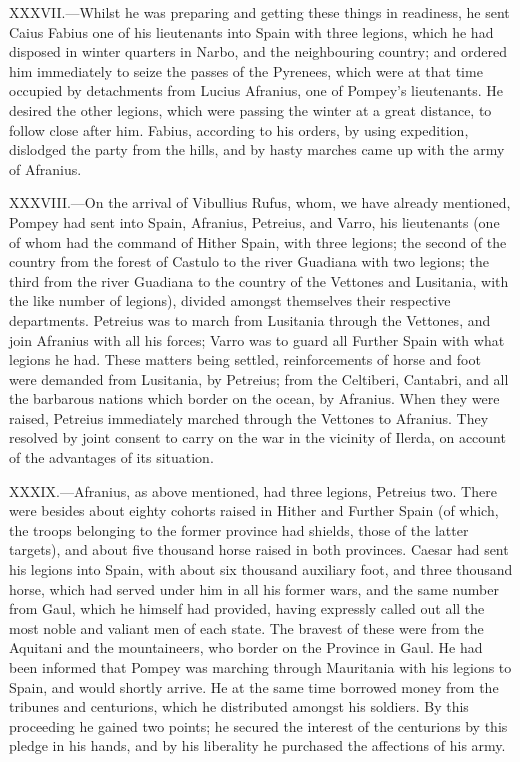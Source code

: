 XXXVII.—Whilst he was preparing and getting these things in readiness,
he sent Caius Fabius one of his lieutenants into Spain with three
legions, which he had disposed in winter quarters in Narbo, and the
neighbouring country; and ordered him immediately to seize the passes of
the Pyrenees, which were at that time occupied by detachments from
Lucius Afranius, one of Pompey's lieutenants. He desired the other
legions, which were passing the winter at a great distance, to follow
close after him. Fabius, according to his orders, by using expedition,
dislodged the party from the hills, and by hasty marches came up with
the army of Afranius.

XXXVIII.—On the arrival of Vibullius Rufus, whom, we have already
mentioned, Pompey had sent into Spain, Afranius, Petreius, and Varro,
his lieutenants (one of whom had the command of Hither Spain, with three
legions; the second of the country from the forest of Castulo to the
river Guadiana with two legions; the third from the river Guadiana to
the country of the Vettones and Lusitania, with the like number of
legions), divided amongst themselves their respective departments.
Petreius was to march from Lusitania through the Vettones, and join
Afranius with all his forces; Varro was to guard all Further Spain with
what legions he had. These matters being settled, reinforcements of
horse and foot were demanded from Lusitania, by Petreius; from the
Celtiberi, Cantabri, and all the barbarous nations which border on the
ocean, by Afranius. When they were raised, Petreius immediately marched
through the Vettones to Afranius. They resolved by joint consent to
carry on the war in the vicinity of Ilerda, on account of the advantages
of its situation.

XXXIX.—Afranius, as above mentioned, had three legions, Petreius two.
There were besides about eighty cohorts raised in Hither and Further
Spain (of which, the troops belonging to the former province had
shields, those of the latter targets), and about five thousand horse
raised in both provinces. Caesar had sent his legions into Spain, with
about six thousand auxiliary foot, and three thousand horse, which had
served under him in all his former wars, and the same number from Gaul,
which he himself had provided, having expressly called out all the most
noble and valiant men of each state. The bravest of these were from the
Aquitani and the mountaineers, who border on the Province in Gaul. He
had been informed that Pompey was marching through Mauritania with his
legions to Spain, and would shortly arrive. He at the same time borrowed
money from the tribunes and centurions, which he distributed amongst his
soldiers. By this proceeding he gained two points; he secured the
interest of the centurions by this pledge in his hands, and by his
liberality he purchased the affections of his army.

